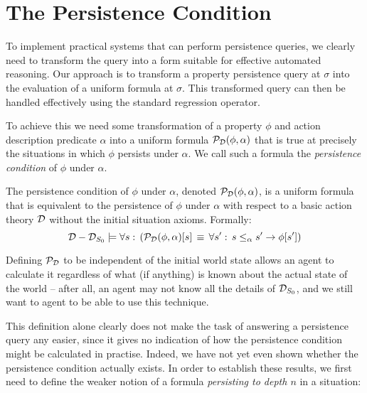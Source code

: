 \section{The Persistence Condition\label{sec:Persistence:Condition}}

To implement practical systems that can perform persistence queries,
we clearly need to transform the query into a form suitable for effective
automated reasoning. Our approach is to transform a property persistence
query at $\sigma$ into the evaluation of a uniform formula at $\sigma$.
This transformed query can then be handled effectively using the standard
regression operator.

To achieve this we need some transformation of a property $\phi$
and action description predicate $\alpha$ into a uniform formula
$\mathcal{P}_{\mathcal{D}}(\phi,\alpha)$ that is true at precisely
the situations in which $\phi$ persists under $\alpha$. We call
such a formula the \emph{persistence condition} of $\phi$ under $\alpha$.

\begin{defnL}
 The persistence condition of $\phi$
under $\alpha$, denoted $\mathcal{P}_{\mathcal{D}}(\phi,\alpha)$,
is a uniform formula that is equivalent to the persistence of $\phi$
under $\alpha$ with respect to a basic action theory $\mathcal{D}$
without the initial situation axioms. Formally:\label{def:persistence-condition}\[
\mathcal{D}-\mathcal{D}_{S_{0}}\models\forall s:\,\left(\mathcal{P}_{\mathcal{D}}(\phi,\alpha)[s]\,\equiv\,\forall s':\, s\leq_{\alpha}s'\rightarrow\phi[s']\right)\]

\end{defnL}
Defining $\mathcal{P}_{\mathcal{D}}$ to be independent of the initial
world state allows an agent to calculate it regardless of what (if
anything) is known about the actual state of the world -- after all,
an agent may not know all the details of $\mathcal{D}_{S_{0}}$, and we still
want to agent to be able to use this technique.

This definition alone clearly does not make the task of answering
a persistence query any easier, since it gives no indication of how
the persistence condition might be calculated in practise. Indeed,
we have not yet even shown whether the persistence condition actually
exists. In order to establish these results, we first need to define
the weaker notion of a formula \emph{persisting to depth $n$} in
a situation:

